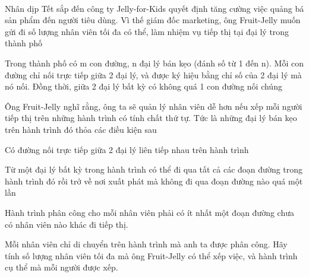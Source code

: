  

Nhân dịp Tết sắp đến công ty Jelly-for-Kids quyết định tăng cường việc quảng bá sản phẩm đến người tiêu dùng. Vì thế giám đốc marketing, ông Fruit-Jelly muốn gửi đi số lượng nhân viên tối đa có thể, làm nhiệm vụ tiếp thị tại đại lý trong thành phố

Trong thành phố có m con đường, n đại lý bán kẹo (đánh số từ 1 đến n). Mỗi con đường chỉ nối trực tiếp giữa 2 đại lý, và được ký hiệu bằng chỉ số của 2 đại lý mà nó nối. Đồng thời, giữa 2 đại lý bất kỳ có không quá 1 con đường nối chúng

Ông Fruit-Jelly nghĩ rằng, ông ta sẽ quản lý nhân viên dễ hơn nếu xếp mỗi người tiếp thị trên những hành trình có tính chất thứ tự. Tức là những đại lý bán kẹo trên hành trình đó thỏa các điều kiện sau

Có đường nối trực tiếp giữa 2 đại lý liên tiếp nhau trên hành trình

Từ một đại lý bất kỳ trong hành trình có thể đi qua tất cả các đoạn đường trong hành trình đó rồi trở về nơi xuất phát mà không đi qua đoạn đường nào quá một lần

Hành trình phân công cho mỗi nhân viên phải có ít nhất một đoạn đường chưa có nhân viên nào khác đi tiếp thị.

Mỗi nhân viên chỉ di chuyển trên hành trình mà anh ta được phân công. Hãy tính số lượng nhân viên tối đa mà ông Fruit-Jelly có thể xếp việc, và hành trình cụ thể mà mỗi người được xếp.

\